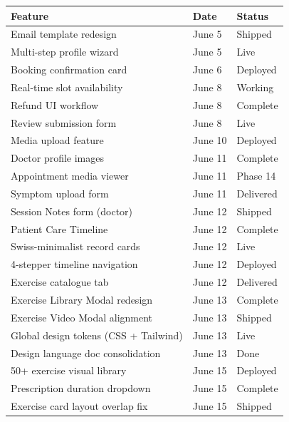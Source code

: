 \documentclass[11pt,a4paper]{article}
\begin{document}
\begin{itemize}
{\begin{table}[h!]
\centering
\begin{tabularx}{\textwidth}{X l l}
\toprule
\textbf{Feature} & \textbf{Date} & \textbf{Status} \\
\midrule
Email template redesign                   & June 5  & Shipped   \\
Multi-step profile wizard                 & June 5  & Live      \\
Booking confirmation card                 & June 6  & Deployed  \\
Real-time slot availability               & June 8  & Working   \\
Refund UI workflow                        & June 8  & Complete  \\
Review submission form                    & June 8  & Live      \\
Media upload feature                      & June 10 & Deployed  \\
Doctor profile images                     & June 11 & Complete  \\
Appointment media viewer                  & June 11 & Phase 14  \\
Symptom upload form                       & June 11 & Delivered \\
Session Notes form (doctor)               & June 12 & Shipped   \\
Patient Care Timeline                     & June 12 & Complete  \\
Swiss-minimalist record cards             & June 12 & Live      \\
4-stepper timeline navigation             & June 12 & Deployed  \\
Exercise catalogue tab                    & June 12 & Delivered \\
Exercise Library Modal redesign           & June 13 & Complete  \\
Exercise Video Modal alignment            & June 13 & Shipped   \\
Global design tokens (CSS + Tailwind)     & June 13 & Live      \\
Design language doc consolidation         & June 13 & Done      \\
50+ exercise visual library               & June 15 & Deployed  \\
Prescription duration dropdown           & June 15 & Complete  \\
Exercise card layout overlap fix          & June 15 & Shipped   \\

\end{tabularx}
\end{table}}
\end{itemize}
\end{document}
